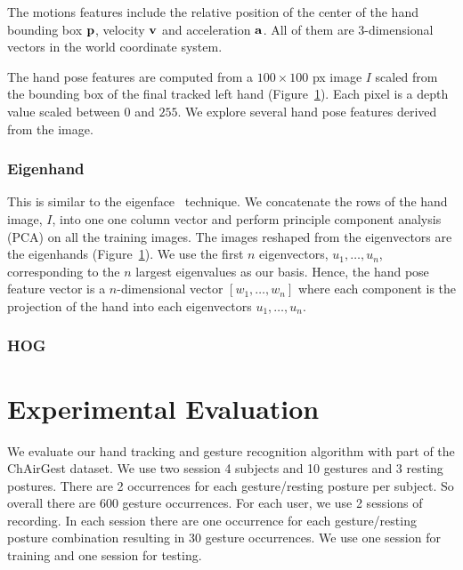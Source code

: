 \documentclass{sig-alternate}
\begin{document}
The motions features include the relative position of the center of
the hand bounding box $\bf{p}$, velocity $\bf{v}$ and acceleration $\bf{a}$.
All of them are 3-dimensional vectors in the world
coordinate system.

The hand pose features are computed from a $100 \times 100$ px image $I$ scaled
from the bounding box of the final tracked left hand (Figure~\ref{}). Each pixel
is a depth value scaled between $0$ and $255$. We explore several hand pose 
features derived from the image.

\begin{figure}

\end{figure}

\subsubsection{Eigenhand}
This is similar to the eigenface~\cite{turk91} technique. We concatenate the
rows of the hand image, $I$, into one one column vector and perform principle
component analysis (PCA) on all the training images. The images
reshaped from the eigenvectors are the eigenhands (Figure~\ref{}). We use
the first $n$ eigenvectors, $u_1, \ldots, u_n$, corresponding to the 
$n$ largest eigenvalues as our basis.
Hence, the hand pose feature vector is a $n$-dimensional vector $[w_1,
\ldots, w_n]$ where each component is the projection of the hand into each
eigenvectors $u_1, \ldots, u_n$.

\begin{figure}

\end{figure}

\subsubsection{HOG}


\section{Experimental Evaluation}
We evaluate our hand tracking and gesture recognition algorithm with part of the ChAirGest 
dataset. We use two session 4 subjects and 10 gestures and 3 resting postures.  
There are 2 occurrences for each gesture/resting posture per subject. So overall 
there are 600 gesture occurrences. For each user, we use 2 sessions of recording. 
In each session there are one occurrence for each gesture/resting posture combination 
resulting in 30 gesture occurrences. We use one session for training and one session for testing.
\end{document}
